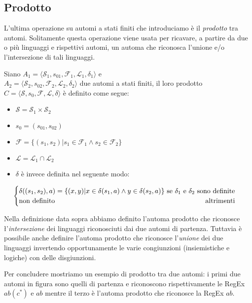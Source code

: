 \subsection{Prodotto}
L'ultima operazione su automi a stati finiti che introduciamo è il \emph{prodotto} tra automi. Solitamente questa operazione viene usata per ricavare, a partire da due o più linguaggi e rispettivi automi, un automa che riconosca l'unione e/o l'intersezione di tali linguaggi.
\begin{definition} \label{def:FSA_Product}
    Siano $A_1 = \langle \mathcal{S}_1, s_{01}, \mathcal{F}_1, \mathcal{L}_1, \delta_1 \rangle$ e \\ $A_2 = \langle \mathcal{S}_2, s_{02}, \mathcal{F}_2, \mathcal{L}_2, \delta_2 \rangle$ due automi a stati finiti, il loro prodotto $C = \langle \mathcal{S}, s_0, \mathcal{F}, \mathcal{L}, \delta \rangle$ è definito come segue:
    \begin{itemize}
        \item   $\mathcal{S} = \mathcal{S}_1 \times \mathcal{S}_2$
        \item $s_0 = (s_{01}, s_{02})$
        \item $\mathcal{F} = \{ (s_1, s_2) | s_1 \in \mathcal{F}_1 \land s_2 \in \mathcal{F}_2 \}$
        \item $\mathcal{L} = \mathcal{L}_1 \cap \mathcal{L}_2$
        \item $\delta$ è invece definita nel seguente modo:
    \end{itemize}
    \begin{equation*}
        \begin{cases}
            \text{$\delta ((s_1, s_2), a) = \{ (x,y) | x \in \delta(s_1, a) \land y \in \delta(s_2, a) \}$ \hfill se $\delta_1$ e $\delta_2$ sono definite} \\
            \text{non definito} \hfill \text{altrimenti}
        \end{cases}
    \end{equation*}
\end{definition}
\begin{remark}
    Nella definizione data sopra abbiamo definito l'automa prodotto che riconosce \l'\emph{intersezione} dei linguaggi riconosciuti dai due automi di partenza. Tuttavia è possibile anche definire l'automa prodotto che riconosce l'\emph{unione} dei due linguaggi invertendo opportunamente le varie congiunzioni (insiemistiche e logiche) con delle disgiunzioni.
\end{remark}
Per concludere mostriamo un esempio di prodotto tra due automi: i primi due automi in figura sono quelli di partenza e riconoscono rispettivamente le RegEx $ab(c^*)$ e $ab$ mentre il terzo è l'automa prodotto che riconosce la RegEx $ab$.
